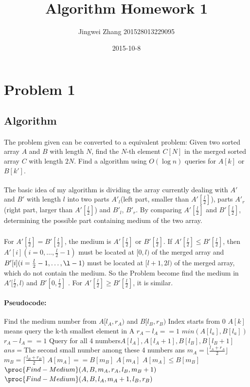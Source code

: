 \documentclass[]{article}
\title{Algorithm Homework 1}
\date{2015-10-8}
\author{Jingwei Zhang 201528013229095}
\begin{document}
    \maketitle
    \section{Problem 1}
        \subsection{Algorithm}
            \paragraph{} The problem given can be converted to a equivalent problem: Given two sorted array $A$ and $B$ with length $N$, find the $N$-th element $C[N]$ in the merged sorted array $C$ with length $2N$. Find a algorithm using $ O(\log n) $ queries for $ A[k] $ or $ B[k'] $.
            \paragraph{} The basic idea of my algorithm is dividing the array currently dealing with $A'$ and $B'$ with length $l$ into two parts $A'_l$(left part, smaller than $A'[\frac{l}{2}]$), parts $A'_r$(right part, larger than $A'[\frac{l}{2}]$) and $B'_l$, $B'_r$. By comparing $A'[\frac{l}{2}]$ and $B'[\frac{l}{2}]$, determining the possible part containing medium of the two array.
            \subparagraph{} For $A'[\frac{l}{2}] = B'[\frac{l}{2}]$, the medium is $A'[\frac{l}{2}]$ or $B'[\frac{l}{2}]$.
            If $A'[\frac{l}{2}] \leq B'[\frac{l}{2}]$, then $A'[i](i=0,\dots,\frac{l}{2}-1)$ must be located at $[0,l)$ of the merged array and $B'[i](i=\frac{l}{2}-1,\dots,\l-1)$ must be located at $[l+1,2l)$ of the merged array, which do not contain the medium. So the Problem become find the medium in $A'[\frac{l}{2},l)$ and $B'[0,\frac{l}{2}]$ . 
            For $A'[\frac{l}{2}] \geq B'[\frac{l}{2}]$, it is similar.
            
            \paragraph{Pseudocode:}
\begin{codebox}
\zi    \Comment Find the medium number from $A[l_A,r_A)$ and $B[l_B,r_B)$
\zi    \Comment Index starts from 0
\zi    \Comment $A[k]$ means query the k-th smallest element in A
\li    \If $r_A - l_A == 1$
\li        \Then \Return $ min(A[l_a],B[l_a])$
       \End
\li    \If $r_A - l_A == 1$
\li        \Then Query for all 4 numbers$A[l_A],A[l_A+1],B[l_B],B[l_B+1]$
\li        $ans = $The second small number among these 4 numbers
\li        \Return ans
           \End
\li    $m_A = \lfloor \frac{l_A+r_A}{2} \rfloor$
\li    $m_B = \lceil \frac{l_B+r_B}{2} \rceil$
\li    \If $A[m_A]==B[m_B]$
\li        \Then \Return $A[m_A]$
\li    \ElseIf $A[m_A] \leq B[m_B]$
\li        \Then \Return $\proc{Find-Medium}(A,B,m_A,r_A,l_B,m_B+1)$
\li    \ElseNoIf \Return $\proc{Find-Medium}(A,B,l_A,m_A+1,l_B,r_B)$
       \End
\end{codebox}
\end{document}
